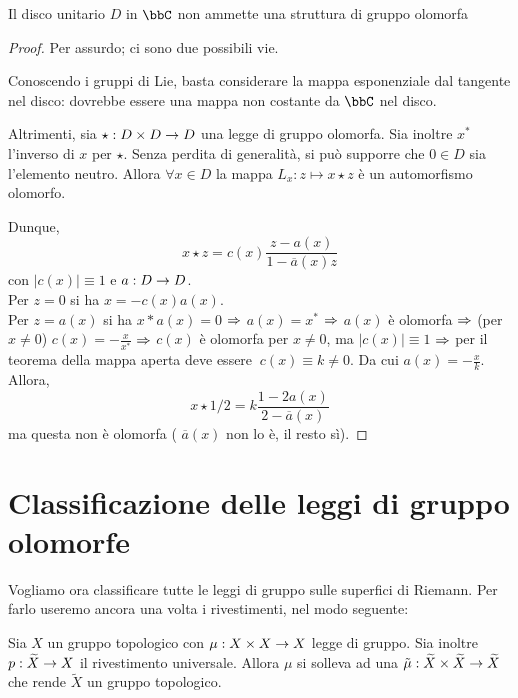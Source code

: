 \begin{teorema}
Il disco unitario $D$ in $\bbC$ non ammette una struttura di gruppo olomorfa
\end{teorema}

\begin{proof}
Per assurdo; ci sono due possibili vie.

Conoscendo i gruppi di Lie, basta considerare la mappa esponenziale dal tangente nel disco: dovrebbe essere una mappa non costante da $\bbC$ nel disco. \hfill \Lightning

Altrimenti, sia $\star : D\times D \rightarrow D$ una legge di gruppo olomorfa. Sia inoltre $x^{*}$ l'inverso di $x$ per $\star$. Senza perdita di generalità, si può supporre che $0 \in D$ sia l'elemento neutro.
Allora $\forall x\in D$ la mappa $L_{x}: z\mapsto x\star z$ è un automorfismo olomorfo.

Dunque,  $$x\star z = c(x)\frac{z -a(x)}{1- \overline{a}(x) z}$$
con $|c(x)|\equiv 1$ e $a:D \rightarrow D$.\\
Per $z=0$ si ha $x=-c(x)a(x)$.\\
Per $z=a(x)$ si ha $x*a(x)=0$ $\Rightarrow$ $a(x)=x^{*}$ $\Rightarrow$ $a(x)$ è olomorfa $\Rightarrow$ (per $x\neq 0$) $c(x)=-\frac{x}{x^{*}}$ $\Rightarrow$ $c(x)$ è olomorfa per $x\neq 0$, ma $|c(x)| \equiv 1$ $\Rightarrow$ per il teorema della mappa aperta deve essere $ \ c(x) \equiv k \neq 0$. Da cui $a(x)= -\frac{x}{k}$.\\
Allora, $$x\star 1/2 = k\frac{1-2a(x)}{2-\overline{a}(x)}$$
ma questa non è olomorfa ( $\overline{a}(x)$ non lo è, il resto sì).

\end{proof}

\section{Classificazione delle leggi di gruppo olomorfe}
Vogliamo ora classificare tutte le leggi di gruppo sulle superfici di Riemann. Per farlo useremo ancora una volta i rivestimenti, nel modo seguente:

\begin{lemma}
Sia $X$ un gruppo topologico con $\mu : X\times X \rightarrow X$ legge di gruppo. Sia inoltre $p :\widetilde{X} \rightarrow X$ il rivestimento universale.
Allora $\mu$ si solleva ad una $\tilde{\mu} : \widetilde{X} \times \widetilde{X} \rightarrow \widetilde{X}$ che rende $\widetilde{X}$ un gruppo topologico.
\end{lemma}

